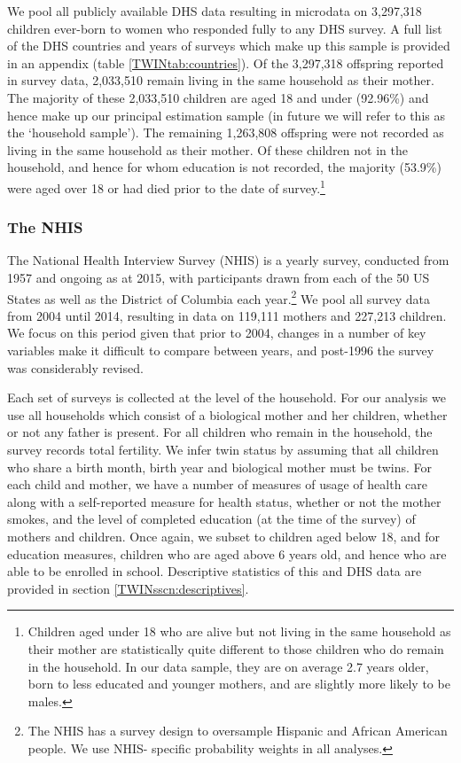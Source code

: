 We pool all publicly available DHS data resulting in microdata on 3,297,318 
children ever-born to women who responded fully to any DHS survey. A full list of 
the DHS countries and years of surveys which make up this sample is provided in
an appendix (table \ref{TWINtab:countries}).  Of the 3,297,318 offspring 
reported in survey data, 2,033,510 remain living in the same household as their 
mother.  The majority of these 2,033,510 children are aged 18 and under (92.96\%) 
and hence make up our principal estimation sample (in future we will refer to this 
as the `household sample'). The remaining 1,263,808 offspring were not recorded as 
living in the same household as their mother.  Of these children not in the 
household, and hence for whom education is not recorded, the majority (53.9\%) 
were aged over 18 or had died prior to the date of survey.\footnote{Children aged 
under 18 who are alive but not living in the same household as their mother are 
statistically quite different to those children who do remain in the household. 
In our data sample, they are on average 2.7 years older, born to less educated 
and younger mothers, and are slightly more likely to be males.}

\subsubsection{The NHIS}
The National Health Interview Survey (NHIS) is a yearly survey, conducted from 
1957 and ongoing as at 2015, with participants drawn from each of the 50 US 
States as well as the District of Columbia each year.\footnote{The NHIS has a
survey design to oversample Hispanic and African American people.  We use NHIS-%
specific probability weights in all analyses.}  We pool all survey data from 
2004 until 2014, resulting in data on 119,111 mothers and 227,213 children. We 
focus on this period given that prior to 2004, changes in a number of key 
variables make it difficult to compare between years, and post-1996 the survey 
was considerably revised.

Each set of surveys is collected at the level of the household.  For our 
analysis we use all households which consist of a biological mother and her 
children, whether or not any father is present.  For all children who remain in
the household, the survey records total fertility.  We infer twin status by
assuming that all children who share a birth month, birth year and biological
mother must be twins.  For each child and mother, we have a number of measures
of usage of health care along with a self-reported measure for health status, 
whether or not the mother smokes, and the level of completed education (at the 
time of the survey) of mothers and children.  Once again, we subset to children
aged below 18, and for education measures, children who are aged above 6 years
old, and hence who are able to be enrolled in school.  Descriptive statistics of
this and DHS data are provided in section \ref{TWINsscn:descriptives}.

